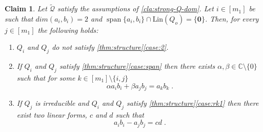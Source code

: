 \documentclass[10pt,a4paper]{article}
\newtheorem{claim}[theorem]{Claim}
\renewcommand{\vec}[1]{{\mathbf{#1}}}
\renewcommand{\C}{\mathbb{C}}
\newcommand{\cQ}{{\mathcal{Q}}}
\newcommand{\spn}[1]{\operatorname{span}\{{#1}\}}
\newcommand{\MS}{\text{Lin}}
\begin{document}
\begin{claim}\label{cla:span-rank1}
Let $\tilde\cQ$ satisfy  the assumptions of \autoref{cla:strong-Q-dom}. Let $i\in[m_1]$ be such that $dim(a_i,b_i) = 2$ and $\spn{a_i,b_i} \cap \MS(Q_o) = \{\vec{0}\}$. Then, for every $j\in [m_1]$ the following holds:
\begin{enumerate}
\item $Q_i$ and $Q_j$ do not satisfy \autoref{thm:structure}\ref{case:2}.

\item If $Q_i$ and $Q_j$ satisfy \autoref{thm:structure}\ref{case:span} then there exists $\alpha, \beta\in\C\setminus\{0\}$ such that for some $k\in[m_1]\setminus \{i,j\}$
\begin{equation} \label{eq:1-alpha}
 \alpha a_ib_i + \beta a_jb_j = a_k b_k \;. 
\end{equation}
\item If $Q_j$ is irreducible and $Q_i$ and $Q_j$ satisfy \autoref{thm:structure}\ref{case:rk1} then there exist two linear forms, $c$ and $d$ such that   
\begin{equation}
 a_ib_i -  a_jb_j = cd \;.
\end{equation}
\end{enumerate}
\end{claim}
\end{document}
